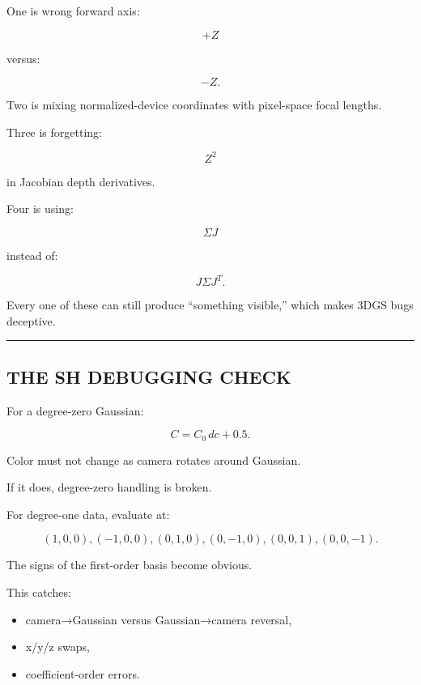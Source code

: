 \hypertarget{04-visual-computing-ii-ch038-the-four-most-common-projection-bugs}{}

One is wrong forward axis:

\[
+Z
\]

versus:

\[
-Z.
\]

Two is mixing normalized-device coordinates with pixel-space focal lengths.

Three is forgetting:

\[
Z^2
\]

in Jacobian depth derivatives.

Four is using:

\[
\Sigma J
\]

instead of:

\[
J\Sigma J^T.
\]

Every one of these can still produce ``something visible,'' which makes 3DGS bugs deceptive.

\begin{center}\rule{0.5\linewidth}{0.5pt}\end{center}

\subsection{THE SH DEBUGGING CHECK}\label{04-visual-computing-ii-ch038-the-sh-debugging-check}

\hypertarget{04-visual-computing-ii-ch038-the-sh-debugging-check}{}

For a degree-zero Gaussian:

\[
C=
C_0\,dc+0.5.
\]

Color must not change as camera rotates around Gaussian.

If it does, degree-zero handling is broken.

For degree-one data, evaluate at:

\[
(1,0,0),
(-1,0,0),
(0,1,0),
(0,-1,0),
(0,0,1),
(0,0,-1).
\]

The signs of the first-order basis become obvious.

This catches:

\begin{itemize}
\tightlist
\item
  camera→Gaussian versus Gaussian→camera reversal,
\item
  x/y/z swaps,
\item
  coefficient-order errors.
\end{itemize}

